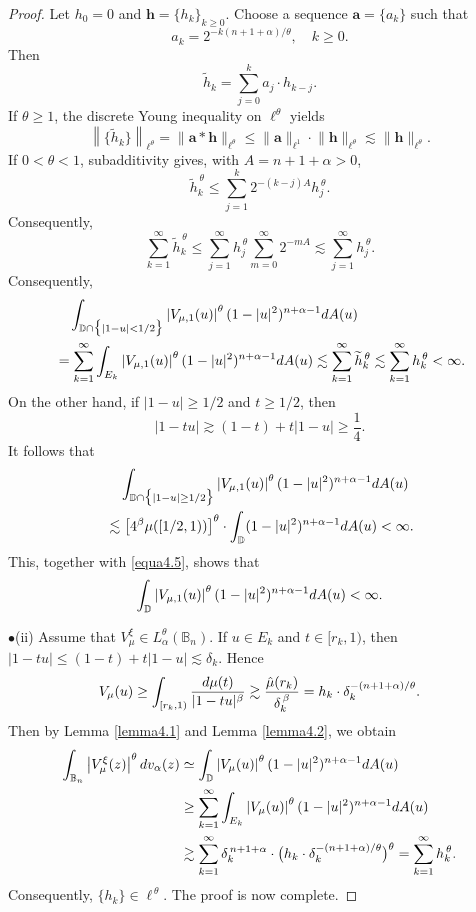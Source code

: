 \documentclass[10pt,a4paper]{amsart}
\begin{document}
\begin{proof}
Let $h_0=0$ and $\mathbf{h}=\{h_k\}_{k\geq 0}$. Choose a sequence $\mathbf{a}=\{a_k\}$ such that
\[
     a_k=2^{-k(n+1+\alpha)/\theta},\quad k\geq 0.
\]
Then 
\[
    \widetilde{h}_k=\sum_{j=0}^{k}a_j\cdot h_{k-j}.
\]
  If  $\theta\geq 1$, the discrete Young inequality on $\ell^{\theta}$ yields
\[
    \left\|\{\widetilde{h}_k\}\right\|_{\ell^{\theta}}=\big\|\mathbf{a}*\mathbf{h}\big\|_{\ell^{\theta}}\leq \big\|\mathbf{a}\big\|_{\ell^1}\cdot \big\|\mathbf{h}\big\|_{\ell^{\theta}}\lesssim \big\|\mathbf{h}\big\|_{\ell^{\theta}}.
\]
 If $0<\theta<1$, subadditivity gives, with $A=n+1+\alpha>0$,
\[
    \widetilde h_k^{\,\theta}
    \leq \sum_{j=1}^{k}2^{-(k-j)A}h_j^{\,\theta}.
\]
Consequently,
\[
    \sum_{k=1}^{\infty}\widetilde h_k^{\,\theta}
    \leq \sum_{j=1}^{\infty}h_j^{\,\theta}
          \sum_{m=0}^{\infty}2^{-mA}
    \lesssim \sum_{j=1}^{\infty}h_j^{\,\theta}.
\]
 Consequently, 
\begin{equation}\label{equa4.5}
\begin{split}
&\quad \int_{\mathbb{D}\cap \big\{|1-u|<1/2\big\}}\left|V_{\mu,1}(u)\right|^{\theta}(1-|u|^2)^{n+\alpha-1}{\rm d}A(u)\\
&=\sum_{k=1}^{\infty}\int_{E_k}\left|V_{\mu,1}(u)\right|^{\theta}(1-|u|^2)^{n+\alpha-1}{\rm d}A(u)\lesssim \sum_{k=1}^{\infty}\widetilde{h}_k^{\,\theta}\lesssim \sum_{k=1}^{\infty}h_k^{\,\theta}<\infty.
\end{split}
\end{equation}
On the other hand, if $|1-u|\geq 1/2$ and $t\geq 1/2$, then
\[
    |1-tu|\gtrsim (1-t)+t|1-u|\geq \frac{1}{4}.
\]
It follows that 
\begin{align*}
&\quad\int_{\mathbb{D}\cap\big\{|1-u|\geq 1/2\big\}}\left|V_{\mu,1}(u)\right|^{\theta}(1-|u|^2)^{n+\alpha-1}{\rm d}A(u)\\
&\lesssim \left[4^{\beta}\mu([1/2,1))\right]^{\theta}\cdot\int_{\mathbb{D}}(1-|u|^2)^{n+\alpha-1}{\rm d}A(u)<\infty.
\end{align*}
This, together with \eqref{equa4.5}, shows that
\[
    \int_{\mathbb{D}}\left|V_{\mu,1}(u)\right|^{\theta}(1-|u|^2)^{n+\alpha-1}{\rm d}A(u)<\infty.
\]

$\bullet$(ii) Assume that $V_{\mu}^{\xi}\in L_{\alpha}^{\theta}(\mathbb{B}_n)$. If $u\in E_k$ and $t\in [r_k,1)$, then $|1-tu|\leq (1-t)+t|1-u|\lesssim \delta_k$. Hence
\[
    V_{\mu}(u)\geq \int_{[r_k,1)}\frac{{\rm d}\mu(t)}{|1-tu|^{\beta}}\gtrsim \frac{\hat{\mu}(r_k)}{\delta_k^{\,\beta}}=h_k\cdot \delta_k^{-(n+1+\alpha)/\theta}.
\]
Then by Lemma \ref{lemma4.1} and Lemma \ref{lemma4.2}, we obtain
\begin{align*}
\int_{\mathbb B_n}\left|V_{\mu}^{\xi}(z)\right|^{\theta}{\rm d}v_{\alpha}(z)&\simeq\int_{\mathbb{D}}\left|V_{\mu}(u)\right|^{\theta}(1-|u|^2)^{n+\alpha-1}{\rm d}A(u)\\
&\geq \sum_{k=1}^{\infty}\int_{E_k}\left|V_{\mu}(u)\right|^{\theta}(1-|u|^2)^{n+\alpha-1}{\rm d}A(u)\\
&\gtrsim \sum_{k=1}^{\infty}\delta_k^{\,n+1+\alpha}\cdot \big(h_k\cdot \delta_k^{-(n+1+\alpha)/\theta}\big)^{\theta}=\sum_{k=1}^{\infty}h_k^{\,\theta}.
\end{align*}
Consequently, $\{h_k\}\in \ell^{\,\theta}$. The proof is now complete.
\end{proof}
\end{document}
